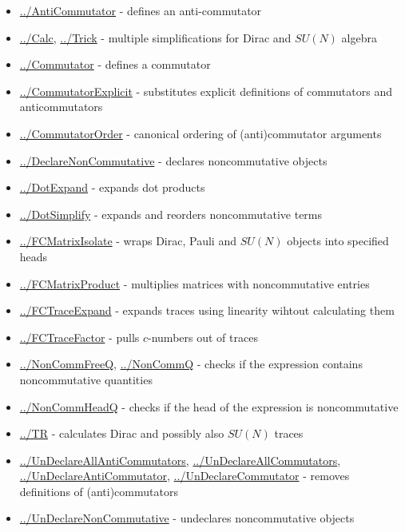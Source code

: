 \documentclass[../FeynCalcManual.tex]{subfiles}
\begin{document}
\begin{itemize}
\tightlist
\item
  \hyperlink{../anticommutator}{../AntiCommutator} - defines an
  anti-commutator
\item
  \hyperlink{../calc}{../Calc}, \hyperlink{../trick}{../Trick} -
  multiple simplifications for Dirac and \(SU(N)\) algebra
\item
  \hyperlink{../commutator}{../Commutator} - defines a commutator
\item
  \hyperlink{../commutatorexplicit}{../CommutatorExplicit} - substitutes
  explicit definitions of commutators and anticommutators
\item
  \hyperlink{../commutatororder}{../CommutatorOrder} - canonical
  ordering of (anti)commutator arguments
\item
  \hyperlink{../declarenoncommutative}{../DeclareNonCommutative} -
  declares noncommutative objects
\item
  \hyperlink{../dotexpand}{../DotExpand} - expands dot products
\item
  \hyperlink{../dotsimplify}{../DotSimplify} - expands and reorders
  noncommutative terms
\item
  \hyperlink{../fcmatrixisolate}{../FCMatrixIsolate} - wraps Dirac,
  Pauli and \(SU(N)\) objects into specified heads
\item
  \hyperlink{../fcmatrixproduct}{../FCMatrixProduct} - multiplies
  matrices with noncommutative entries
\item
  \hyperlink{../fctraceexpand}{../FCTraceExpand} - expands traces using
  linearity wihtout calculating them
\item
  \hyperlink{../fctracefactor}{../FCTraceFactor} - pulls \(c\)-numbers
  out of traces
\item
  \hyperlink{../noncommfreeq}{../NonCommFreeQ},
  \hyperlink{../noncommq}{../NonCommQ} - checks if the expression
  contains noncommutative quantities
\item
  \hyperlink{../noncommheadq}{../NonCommHeadQ} - checks if the head of
  the expression is noncommutative
\item
  \hyperlink{../tr}{../TR} - calculates Dirac and possibly also
  \(SU(N)\) traces
\item
  \hyperlink{../undeclareallanticommutators}{../UnDeclareAllAntiCommutators},
  \hyperlink{../undeclareallcommutators}{../UnDeclareAllCommutators},
  \hyperlink{../undeclareanticommutator}{../UnDeclareAntiCommutator},
  \hyperlink{../undeclarecommutator}{../UnDeclareCommutator} - removes
  definitions of (anti)commutators
\item
  \hyperlink{../undeclarenoncommutative}{../UnDeclareNonCommutative} -
  undeclares noncommutative objects
\end{itemize}
\end{document}
